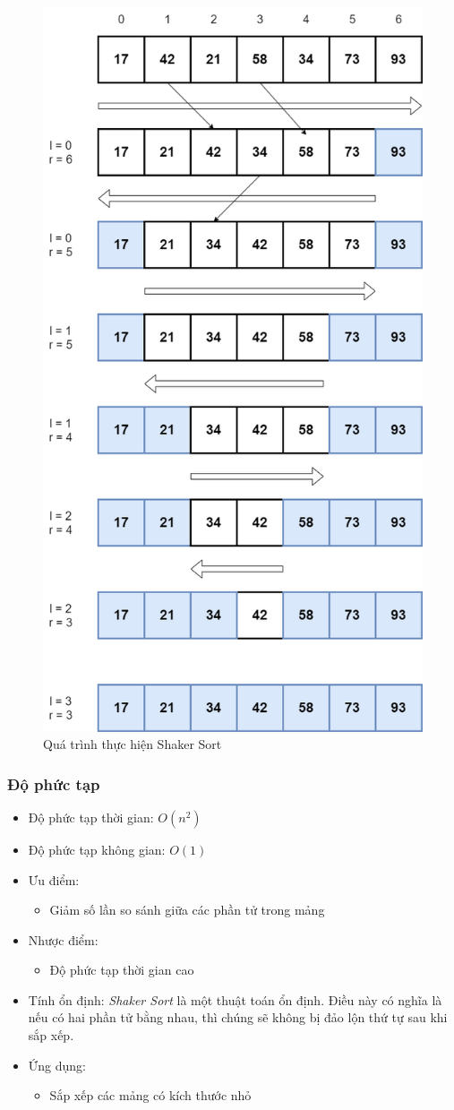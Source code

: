 \begin{figure}[H]
    \centering
    \includegraphics[width=0.6\linewidth]{img/shaker_sort/1.png}
    \caption{Quá trình thực hiện Shaker Sort}
\end{figure}

\subsubsection{Độ phức tạp}

\begin{itemize}
    \item Độ phức tạp thời gian: $O(n^2)$
    \item Độ phức tạp không gian: $O(1)$
    \item Ưu điểm:
        \begin{itemize}
            \item Giảm số lần so sánh giữa các phần tử trong mảng
        \end{itemize}
    \item Nhược điểm:
        \begin{itemize}
            \item Độ phức tạp thời gian cao
        \end{itemize}
    \item Tính ổn định: \textit{Shaker Sort} là một thuật toán ổn định. Điều này có nghĩa là nếu có hai phần tử bằng nhau, thì chúng sẽ không bị đảo lộn thứ tự sau khi sắp xếp.
    \item Ứng dụng:
        \begin{itemize}
            \item Sắp xếp các mảng có kích thước nhỏ
        \end{itemize}
\end{itemize}

